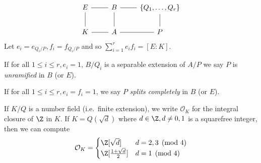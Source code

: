 \documentclass[a4paper]{article}
\renewcommand*{\O}{\mathcal{O}}
\begin{document}
\[
  \begin{tikzcd}
    E \ar[r, dash] \ar[d, dash] & B \ar[r, dash] \ar[d, dash] & \{Q_1, \dots, Q_r\} \ar[d, dash] \\
    K \ar[r, dash] & A \ar[r, dash] & P
  \end{tikzcd}
\]
Let \(e_i = e_{Q_i/P}, f_i = f_{Q_i/P}\) and so \(\sum_{i = 1}^r e_if_i = [E : K]\).

\begin{definition}
  If for all \(1 \leq i \leq r, e_i = 1\), \(B/Q_i\) is a separable extension of \(A/P\) we say \(P\) is \emph{unramified} in \(B\) (or \(E\)).

  If for all \(1 \leq i \leq r, e_i = f_i = 1\), we say \(P\) \emph{splits completely} in \(B\) (or \(E\)).
\end{definition}

\begin{eg}
  If \(K/Q\) is a number field (i.e.\ finite extension), we write \(\O_K\) for the integral closure of \(\Z\) in \(K\). If \(K = Q(\sqrt d)\) where \(d \in \Z, d \neq 0, 1\) is a squarefree integer, then we can compute
  \[
    \O_K =
    \begin{cases}
      \Z[\sqrt d] & d = 2, 3 \pmod 4 \\
      \Z[\frac{1 + \sqrt d}{2}] & d = 1 \pmod 4
    \end{cases}
  \]
\end{eg}




\printindex
\end{document}
